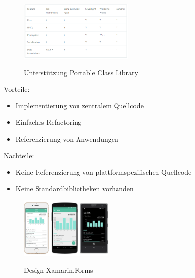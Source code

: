 \begin{figure}[h]
	\begin{center}
		\includegraphics[width=0.5\textwidth]{images/technische_grundlagen/pclSupport.png}
	\end{center}	
	\caption{Unterstützung Portable Class Library}
	\cite{Xamarin.PortableClass}
	\label{fig:pcl_support}
\end{figure}

\newpage
\noindent
Vorteile:
\begin{itemize}
	\item Implementierung von zentralem Quellcode
	\item Einfaches Refactoring
	\item Referenzierung von Anwendungen
\end{itemize}
\noindent
Nachteile:
\begin{itemize}
	\item Keine Referenzierung von plattformspezifischen Quellcode
	\item Keine Standardbibliotheken vorhanden
\end{itemize}

\begin{figure}
	\begin{center}
		\includegraphics[width=0.4\textwidth]{images/technische_grundlagen/forms.png}
	\end{center}	
	\caption{Design Xamarin.Forms}
	\cite{Xamarin.Builda}
	\label{fig:forms}
\end{figure}

